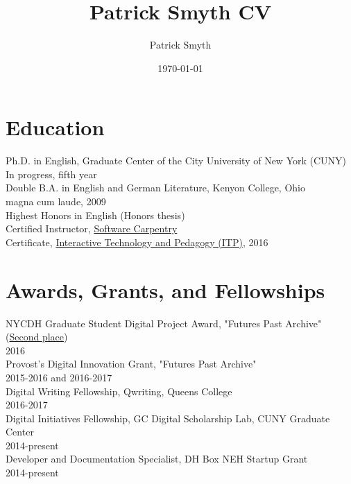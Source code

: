 \documentclass[11pt]{article}
\author{Patrick Smyth}
\date{\today}
\title{Patrick Smyth CV}
\begin{document}
\maketitle
\section*{Education}
\label{sec:orgheadline1}

Ph.D. in English, Graduate Center of the City University of New York (CUNY)\\
        In progress, fifth year\\

Double B.A. in English and German Literature, Kenyon College, Ohio\\
        magna cum laude, 2009\\
        Highest Honors in English (Honors thesis)\\

Certified Instructor, \href{https://software-carpentry.org/about/}{Software Carpentry}\\

Certificate, \href{https://www.gc.cuny.edu/Page-Elements/Academics-Research-Centers-Initiatives/Certificate-Programs/Interactive-Technology-and-Pedagogy}{Interactive Technology and Pedagogy (ITP)}, 2016\\

\section*{Awards, Grants, and Fellowships}
\label{sec:orgheadline2}
NYCDH Graduate Student Digital Project Award, "Futures Past Archive" (\href{http://nycdh.org/nycdh-graduate-student-digital-project-awards-2016/}{Second place})\\
2016\\

Provost's Digital Innovation Grant, "Futures Past Archive"\\
2015-2016 and 2016-2017\\

Digital Writing Fellowship, Qwriting, Queens College\\
2016-2017\\

Digital Initiatives Fellowship, GC Digital Scholarship Lab, CUNY Graduate Center\\
2014-present\\

Developer and Documentation Specialist, DH Box NEH Startup Grant\\
2014-present\\
\end{document}
